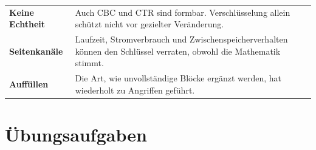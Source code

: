 \begin{warnung}
\begin{center}
{\small
\renewcommand{\arraystretch}{1.5}
\begin{tabular}{@{}P{2.4cm}P{6.2cm}@{}}
\toprule
\textbf{Keine Echtheit} & Auch CBC und CTR sind formbar. Verschlüsselung allein schützt nicht vor gezielter Veränderung.\\
\textbf{Seitenkanäle} & Laufzeit, Stromverbrauch und Zwischenspeicherverhalten können den Schlüssel verraten, obwohl die Mathematik stimmt.\\
\textbf{Auffüllen} & Die Art, wie unvollständige Blöcke ergänzt werden, hat wiederholt zu Angriffen geführt.\\
\bottomrule
\end{tabular}}
\end{center}

\begin{center}
\begin{minipage}{0.88\textwidth}
\end{minipage}
\end{center}
\end{warnung}

\section{Übungsaufgaben}

